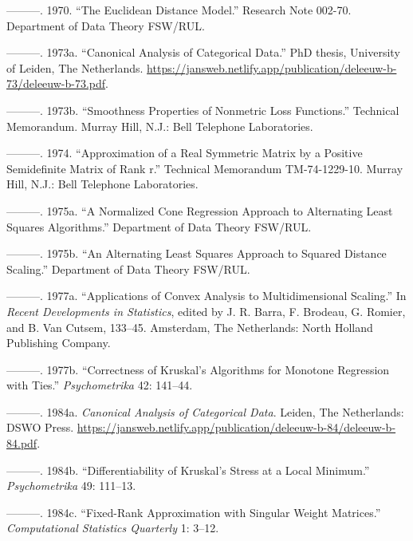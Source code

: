 \documentclass[
  12pt,
  letterpaper,
  DIV=11,
  numbers=noendperiod]{scrreprt}
\newlength{\cslhangindent}
\newenvironment{CSLReferences}[2] %
 {\begin{list}{}{%
  \setlength{\itemindent}{0pt}
  \setlength{\leftmargin}{0pt}
  \setlength{\parsep}{0pt}
  \ifodd #1
   \setlength{\leftmargin}{\cslhangindent}
   \setlength{\itemindent}{-1\cslhangindent}
  \fi
  \setlength{\itemsep}{#2\baselineskip}}}
 {\end{list}}
\theoremstyle{remark}
\begin{document}
\begin{CSLReferences}{1}{0}
---------. 1970. {``{The Euclidean Distance Model}.''} Research Note
002-70. Department of Data Theory FSW/RUL.

---------. 1973a. {``Canonical Analysis of Categorical Data.''} PhD
thesis, University of Leiden, The Netherlands.
\url{https://jansweb.netlify.app/publication/deleeuw-b-73/deleeuw-b-73.pdf}.

---------. 1973b. {``{Smoothness Properties of Nonmetric Loss
Functions}.''} Technical Memorandum. Murray Hill, N.J.: Bell Telephone
Laboratories.

---------. 1974. {``Approximation of a Real Symmetric Matrix by a
Positive Semidefinite Matrix of Rank r.''} Technical Memorandum
TM-74-1229-10. Murray Hill, N.J.: Bell Telephone Laboratories.

---------. 1975a. {``{A Normalized Cone Regression Approach to
Alternating Least Squares Algorithms}.''} Department of Data Theory
FSW/RUL.

---------. 1975b. {``{An Alternating Least Squares Approach to Squared
Distance Scaling}.''} Department of Data Theory FSW/RUL.

---------. 1977a. {``Applications of Convex Analysis to Multidimensional
Scaling.''} In \emph{Recent Developments in Statistics}, edited by J. R.
Barra, F. Brodeau, G. Romier, and B. Van Cutsem, 133--45. Amsterdam, The
Netherlands: North Holland Publishing Company.

---------. 1977b. {``Correctness of Kruskal's Algorithms for Monotone
Regression with Ties.''} \emph{Psychometrika} 42: 141--44.

---------. 1984a. \emph{Canonical Analysis of Categorical Data}. Leiden,
The Netherlands: DSWO Press.
\url{https://jansweb.netlify.app/publication/deleeuw-b-84/deleeuw-b-84.pdf}.

---------. 1984b. {``{Differentiability of Kruskal's Stress at a Local
Minimum}.''} \emph{Psychometrika} 49: 111--13.

---------. 1984c. {``Fixed-Rank Approximation with Singular Weight
Matrices.''} \emph{Computational Statistics Quarterly} 1: 3--12.


\end{CSLReferences}
\end{document}
